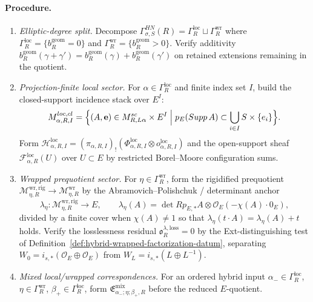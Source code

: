 \paragraph{Procedure.}
\begin{enumerate}
\item \emph{Elliptic-degree split.}  Decompose
\(\Gamma_{\sigma,S}^{HN}(R)
=\Gamma_R^{\mathrm{loc}}\sqcup\Gamma_R^{\mathrm{wr}}\) where
\(\Gamma_R^{\mathrm{loc}}=\{b_R^{\mathrm{geom}}=0\}\) and
\(\Gamma_R^{\mathrm{wr}}=\{b_R^{\mathrm{geom}}>0\}\).  Verify additivity
\(b_R^{\mathrm{geom}}(\gamma+\gamma')
=b_R^{\mathrm{geom}}(\gamma)+b_R^{\mathrm{geom}}(\gamma')\) on retained
extensions remaining in the quotient.

\item \emph{Projection-finite local sector.}  For
\(\alpha\in\Gamma_R^{\mathrm{loc}}\) and finite index set \(I\), build
the closed-support incidence stack over \(E^I\):
\[
\mathfrak M^{\mathrm{loc,cl}}_{\alpha,R,I}
=
\Bigl\{(A,\mathbf e)\in\mathfrak M^{\mathrm{sc}}_{R,L\alpha}\times E^I
\Bigm|p_E(\mathrm{Supp}\,A)\subset\bigcup_{i\in I}S\times\{e_i\}\Bigr\}.
\]
Form
\(\mathscr H^{\mathrm{loc}}_{\alpha,R,I}=
(\pi_{\alpha,R,I})_!(\Phi_{\alpha,R,I}^{\mathrm{loc}}\otimes
o_{\alpha,R,I}^{\mathrm{loc}})\) and the open-support sheaf
\(\mathcal F_{\alpha,R}^{\mathrm{loc}}(U)\) over \(U\subset E\) by
restricted Borel--Moore configuration sums.

\item \emph{Wrapped prequotient sector.}  For
\(\eta\in\Gamma_R^{\mathrm{wr}}\), form the rigidified prequotient
\(\mathcal M_{\eta,R}^{\mathrm{wr,rig}}\to\mathcal M_{\eta,R}^{\mathrm{wr}}\)
by the Abramovich--Polishchuk / determinant anchor
\[
\lambda_\eta:\mathcal M_{\eta,R}^{\mathrm{wr,rig}}\longrightarrow E,
\qquad
\lambda_\eta(A)=\det Rp_{E,*}A
\otimes\mathcal O_E(-\chi(A)\cdot 0_E),
\]
divided by a finite cover when \(\chi(A)\ne 1\) so that
\(\lambda_\eta(t\cdot A)=\lambda_\eta(A)+t\) holds.  Verify the
losslessness residual \(\mathfrak o^{\lambda,\mathrm{loss}}_R=0\) by
the Ext-distinguishing test of
Definition~\ref{def:hybrid-wrapped-factorization-datum}, separating
\(W_0=i_{s,*}(\mathcal O_E\oplus\mathcal O_E)\) from
\(W_L=i_{s,*}(L\oplus L^{-1})\).

\item \emph{Mixed local/wrapped correspondences.}  For an ordered
hybrid input
\(\alpha_-\in\Gamma_R^{\mathrm{loc}}\),
\(\eta\in\Gamma_R^{\mathrm{wr}}\),
\(\beta_+\in\Gamma_R^{\mathrm{loc}}\), form
\(\mathfrak E^{\mathrm{mix}}_{\alpha_-;\eta;\beta_+,R}\) before the
reduced \(E\)-quotient.


\end{enumerate}

